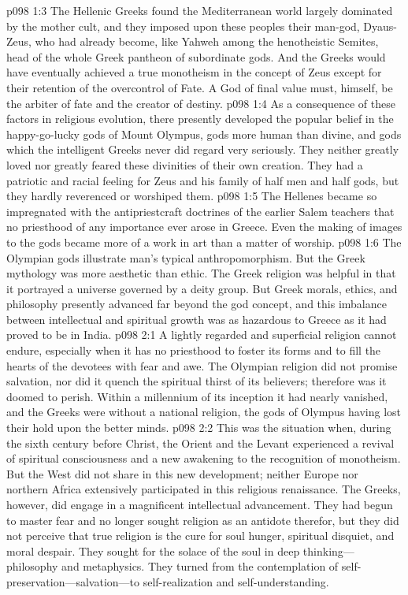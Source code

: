 \vs p098 1:3 The Hellenic Greeks found the Mediterranean world largely dominated by the mother cult, and they imposed upon these peoples their man\hyp{}god, Dyaus\hyp{}Zeus, who had already become, like Yahweh among the henotheistic Semites, head of the whole Greek pantheon of subordinate gods. And the Greeks would have eventually achieved a true monotheism in the concept of Zeus except for their retention of the overcontrol of Fate. A God of final value must, himself, be the arbiter of fate and the creator of destiny.
\vs p098 1:4 As a consequence of these factors in religious evolution, there presently developed the popular belief in the happy\hyp{}go\hyp{}lucky gods of Mount Olympus, gods more human than divine, and gods which the intelligent Greeks never did regard very seriously. They neither greatly loved nor greatly feared these divinities of their own creation. They had a patriotic and racial feeling for Zeus and his family of half men and half gods, but they hardly reverenced or worshiped them.
\vs p098 1:5 The Hellenes became so impregnated with the antipriestcraft doctrines of the earlier Salem teachers that no priesthood of any importance ever arose in Greece. Even the making of images to the gods became more of a work in art than a matter of worship.\plusone
\vs p098 1:6 The Olympian gods illustrate man’s typical anthropomorphism. But the Greek mythology was more aesthetic than ethic. The Greek religion was helpful in that it portrayed a universe governed by a deity group. But Greek morals, ethics, and philosophy presently advanced far beyond the god concept, and this imbalance between intellectual and spiritual growth was as hazardous to Greece as it had proved to be in India.
\vs p098 2:1 A lightly regarded and superficial religion cannot endure, especially when it has no priesthood to foster its forms and to fill the hearts of the devotees with fear and awe. The Olympian religion did not promise salvation, nor did it quench the spiritual thirst of its believers; therefore was it doomed to perish. Within a millennium of its inception it had nearly vanished, and the Greeks were without a national religion, the gods of Olympus having lost their hold upon the better minds.
\vs p098 2:2 This was the situation when, during the sixth century before Christ, the Orient and the Levant experienced a revival of spiritual consciousness and a new awakening to the recognition of monotheism. But the West did not share in this new development; neither Europe nor northern Africa extensively participated in this religious renaissance. The Greeks, however, did engage in a magnificent intellectual advancement. They had begun to master fear and no longer sought religion as an antidote therefor, but they did not perceive that true religion is the cure for soul hunger, spiritual disquiet, and moral despair. They sought for the solace of the soul in deep thinking---philosophy and metaphysics. They turned from the contemplation of self\hyp{}preservation---salvation---to self\hyp{}realization and self\hyp{}understanding.
